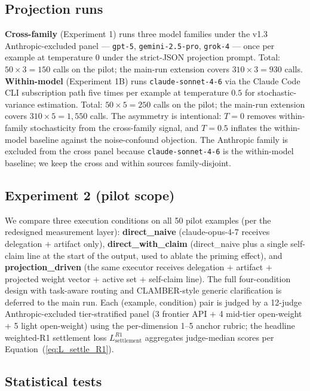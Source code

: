 \subsection{Projection runs}
\label{sec:experiments:projection}

\textbf{Cross-family} (Experiment 1) runs three model families under the v1.3 Anthropic-excluded panel --- \texttt{gpt-5}, \texttt{gemini-2.5-pro}, \texttt{grok-4} --- once per example at temperature $0$ under the strict-JSON projection prompt. Total: $50 \times 3 = 150$ calls on the pilot; the main-run extension covers $310 \times 3 = 930$ calls. \textbf{Within-model} (Experiment 1B) runs \texttt{claude-sonnet-4-6} via the Claude Code CLI subscription path five times per example at temperature $0.5$ for stochastic-variance estimation. Total: $50 \times 5 = 250$ calls on the pilot; the main-run extension covers $310 \times 5 = 1{,}550$ calls. The asymmetry is intentional: $T = 0$ removes within-family stochasticity from the cross-family signal, and $T = 0.5$ inflates the within-model baseline against the noise-confound objection. The Anthropic family is excluded from the cross panel because \texttt{claude-sonnet-4-6} is the within-model baseline; we keep the cross and within sources family-disjoint.

\subsection{Experiment 2 (pilot scope)}
\label{sec:experiments:exp2}

We compare three execution conditions on all 50 pilot examples (per the redesigned measurement layer): \textbf{direct\_naive} (claude-opus-4-7 receives delegation $+$ artifact only), \textbf{direct\_with\_claim} (direct\_naive plus a single self-claim line at the start of the output, used to ablate the priming effect), and \textbf{projection\_driven} (the same executor receives delegation $+$ artifact $+$ projected weight vector $+$ active set $+$ self-claim line). The full four-condition design with task-aware routing and CLAMBER-style generic clarification is deferred to the main run. Each (example, condition) pair is judged by a 12-judge Anthropic-excluded tier-stratified panel (3 frontier API + 4 mid-tier open-weight + 5 light open-weight) using the per-dimension 1--5 anchor rubric; the headline weighted-R1 settlement loss $L_{\text{settlement}}^{R1}$ aggregates judge-median scores per Equation~(\ref{eq:L_settle_R1}).

\subsection{Statistical tests}
\label{sec:experiments:stats}

